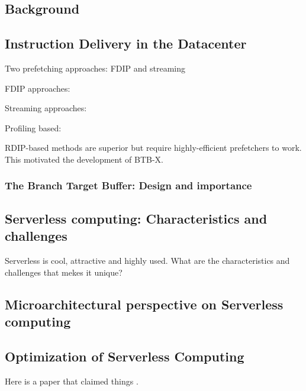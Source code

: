 \documentclass[../main.tex]{subfiles}
\begin{document}
\ifx\chapincluded\undefined
  \begin{refsection}
 \fi


\chapter{Background}


\section{Instruction Delivery in the Datacenter}
\cite{kanev15_profil,ferdman_2012}


Two prefetching approaches: FDIP and streaming


FDIP approaches: \cite{reinman99_fetch_direc_instr_prefet, kumar17_boomer,kumar18_blast_throug_front_end_bottl_with_shotg,kumar20_shoot_down_server_front_end_bottl}

Streaming approaches:
\cite{ferdman11_proac_instr_fetch,kaynak13_shift,kaynak15_confl}

Profiling based:


RDIP-based methods are superior but require highly-efficient prefetchers to work. This motivated the development of BTB-X.

\subsection{The Branch Target Buffer: Design and importance}




\section{Serverless computing: Characteristics and challenges}
Serverless is cool, attractive and highly used. What are the characteristics and challenges that mekes it unique?

\section{Microarchitectural perspective on Serverless computing}

\section{Optimization of Serverless Computing}


Here is a paper that claimed things \cite{kanev15_profil}.



\ifx\chapincluded\undefined
  \printbibliography
  \end{refsection}
 \fi
\end{document}
